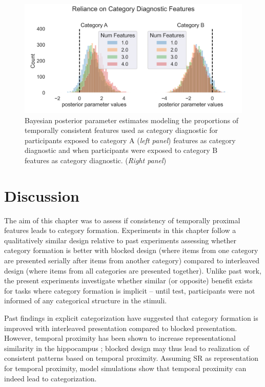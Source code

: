 \begin{figure}[h]
    \centering
    \includegraphics[width = \textwidth]{chapter_notebooks/chapter_4/figures/exp5_bayesmodel_res.png}
    \caption{Bayesian posterior parameter estimates modeling the proportions of temporally consistent features used as category diagnostic for participants exposed to category A (\textit{left panel}) features as category diagnostic and when participants were exposed to category B features as category diagnostic. (\textit{Right panel})}
    \label{fig:exp5-bayesian-estimates-proportions}
\end{figure}





\section{Discussion} 
The aim of this chapter was to assess if consistency of temporally proximal features leads to category formation. Experiments in this chapter follow a qualitatively similar design relative to past experiments assessing whether category formation is better with blocked design (where items from one category are presented serially after items from another category) compared to interleaved design (where items from all categories are presented together). Unlike past work, the present experiments investigate whether similar (or opposite) benefit exists for tasks where category formation is implicit -- until test, participants were not informed of any categorical structure in the stimuli. 

Past findings in explicit categorization have suggested that category formation is improved with interleaved presentation compared to blocked presentation. However, temporal proximity has been shown to increase representational similarity in the hippocampus \parencite{schapiro2013neural}; blocked design may thus lead to realization of consistent patterns based on temporal proximity. Assuming SR as representation for temporal proximity, model simulations show that temporal proximity can indeed lead to categorization. 


